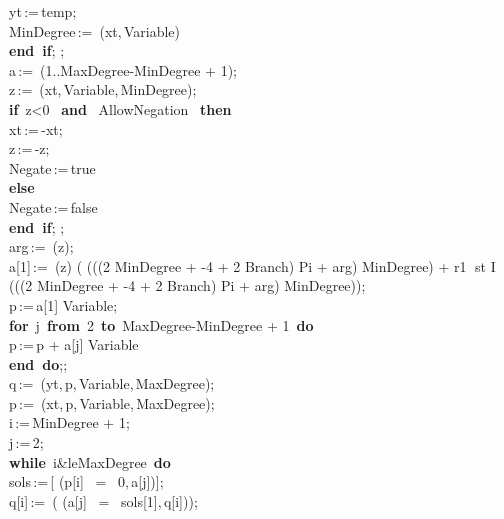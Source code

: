 \documentclass{article}
\begin{document}
\begin{maplelatex}
\begin{center}
\begin{maplelatex}
\begin{center}
{ yt\,:=\,temp;\\
 MinDegree\,:=\, (xt,\,Variable)\\
 \textbf{end\ if}; ;\\
 a\,:=\, (1..MaxDegree-MinDegree + 1);\\
 z\,:=\, (xt,\,Variable,\,MinDegree);\\
 \textbf{if} \,z<0 \, \textbf{and} \, AllowNegation \, \textbf{then} \\
 xt\,:=\,-xt;\\
 z\,:=\,-z;\\
 Negate\,:=\,true\\
 \textbf{else}\\
 Negate\,:=\,false\\
 \textbf{end\ if}; ;\\
 arg\,:=\, (z);\\
 a[1]\,:=\, (z) \ast ( (((2 \ast MinDegree + -4 + 2 \ast Branch) \ast Pi + arg) \ast MinDegree) + r1 st I \ast {} (((2 \ast MinDegree + -4 + 2 \ast Branch) \ast Pi + arg) \ast MinDegree));\\
 p\,:=\,a[1] \ast Variable;\\
 \textbf{for} \,j \,\textbf{from} \,2 \,\textbf{to} \,MaxDegree-MinDegree + 1 \,\textbf{do}\\
 p\,:=\,p + a[j] \ast Variable\\
 \textbf{end\ do};;\\
 q\,:=\, (yt,\,p,\,Variable,\,MaxDegree);\\
 p\,:=\, (xt,\,p,\,Variable,\,MaxDegree);\\
 i\,:=\,MinDegree + 1;\\
 j\,:=\,2;\\
 \textbf{while} \,i&leMaxDegree \,\textbf{do}\\
 sols\,:=\,[ (p[i] \, = \, 0,\,a[j])];\\
 q[i]\,:=\, ( (a[j] \, = \, sols[1],\,q[i]));\\
}
\end{center}
\end{maplelatex}
\end{center}
\end{maplelatex}
\end{document}
